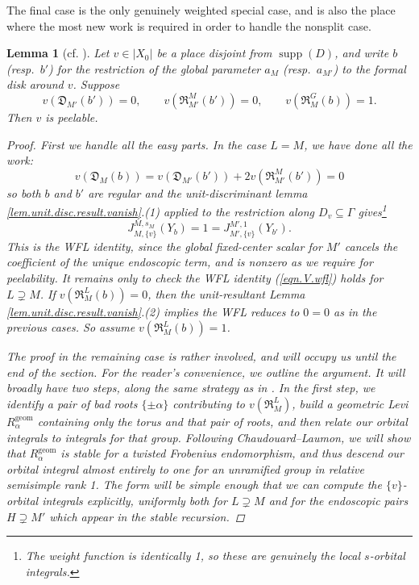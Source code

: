 \documentclass[openany]{amsbook}
\newtheorem{lemma}[theorem]{Lemma}
\theoremstyle{definition}
\theoremstyle{remark}
\numberwithin{equation}{section}
\renewcommand{\-}{\operatorname{-}}
\newcommand{\on}[1]{\operatorname{#1}}
\newcommand{\fD}{\mathfrak{D}}
\newcommand{\fR}{\mathfrak{R}}
\begin{document}
The final case is the only genuinely weighted special case, and is also the place where the most new work is required in order to handle the nonsplit case. 
\begin{lemma}[{cf. \cite[Lemme 17.6.2, Lemme 17.8.1]{CLII}}]\label{lem.tranv.result.2}
    Let $v \in |X_0|$ be a place disjoint from $\on{supp}(D)$, and write $b$ (resp.\ $b'$) for the restriction of the global parameter $a_M$ (resp.\ $a_{M'}$) to the formal disk around $v$. Suppose
    \begin{equation}
        v(\fD_{M'}(b')) = 0, \qquad v(\fR_{M'}^M(b')) = 0, \qquad v(\fR_M^G(b)) = 1.\label{eqn.tranv.R.wt}
    \end{equation}
    Then $v$ is peelable.
    \begin{proof}
        First we handle all the easy parts. In the case $L = M$, we have done all the work:
        $$
            v(\fD_M(b)) = v(\fD_{M'}(b')) + 2 v(\fR_{M'}^M(b')) = 0
        $$
        so both $b$ and $b'$ are regular and the unit-discriminant lemma \ref{lem.unit.disc.result.vanish}.(1) applied to the restriction along $D_v \subseteq \Gamma$ gives\footnote{The weight function is identically 1, so these are genuinely the local $s$-orbital integrals.}
        $$
            J_{M, \{v\}}^{M, s_M}(Y_b) = 1 = J_{M', \{v\}}^{M', 1}(Y_{b'}).
        $$ 
        This is the WFL identity, since the global fixed-center scalar for $M'$ cancels the coefficient of the unique endoscopic term, and is nonzero as we require for peelability. It remains only to check the WFL identity (\ref{eqn.V.wfl}) holds for $L \supsetneq M$. If $v(\fR_M^L(b)) = 0$, then the unit-resultant Lemma \ref{lem.unit.disc.result.vanish}.(2) implies the WFL reduces to $0 = 0$ as in the previous cases. So assume $v(\fR_M^L(b)) = 1$. 
        
        The proof in the remaining case is rather involved, and will occupy us until the end of the section. For the reader's convenience, we outline the argument. It will broadly have two steps, along the same strategy as in \cite[{Lemma 17.6.2, 17.8.1}]{CLII}. In the first step, we identify a pair of bad roots $\{\pm \alpha\}$ contributing to $v(\fR_M^L)$, build a geometric Levi $R_\alpha^{\on{geom}}$ containing only the torus and that pair of roots, and then relate our orbital integrals to integrals for that group. Following Chaudouard--Laumon, we will show that $R_\alpha^{\on{geom}}$ is stable for a twisted Frobenius endomorphism, and thus descend our orbital integral almost entirely to one for an unramified group in relative semisimple rank 1. The form will be simple enough that we can compute the $\{v\}$-orbital integrals explicitly, uniformly both for $L \supsetneq M$ and for the endoscopic pairs $H \supsetneq M'$ which appear in the stable recursion. 
        

\end{proof}
\end{lemma}
\end{document}
